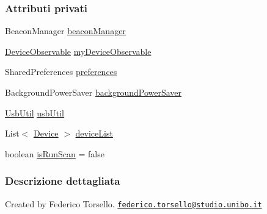 \subsubsection*{Attributi privati}
\begin{DoxyCompactItemize}
\item 
Beacon\+Manager \hyperlink{classit_1_1unibo_1_1torsello_1_1bluetoothpositioning_1_1activities_1_1ApplicationActivity_a973c37226a3dbba6016966c3555aff65_a973c37226a3dbba6016966c3555aff65}{beacon\+Manager}
\item 
\hyperlink{classit_1_1unibo_1_1torsello_1_1bluetoothpositioning_1_1observables_1_1DeviceObservable}{Device\+Observable} \hyperlink{classit_1_1unibo_1_1torsello_1_1bluetoothpositioning_1_1activities_1_1ApplicationActivity_aa6481e11e062d3539e6848f0790852b8_aa6481e11e062d3539e6848f0790852b8}{my\+Device\+Observable}
\item 
Shared\+Preferences \hyperlink{classit_1_1unibo_1_1torsello_1_1bluetoothpositioning_1_1activities_1_1ApplicationActivity_a3ee672ef79c268d0618ff3276c2e85f0_a3ee672ef79c268d0618ff3276c2e85f0}{preferences}
\item 
Background\+Power\+Saver \hyperlink{classit_1_1unibo_1_1torsello_1_1bluetoothpositioning_1_1activities_1_1ApplicationActivity_a85885639575161f4d73d4fc788f44ace_a85885639575161f4d73d4fc788f44ace}{background\+Power\+Saver}
\item 
\hyperlink{classit_1_1unibo_1_1torsello_1_1bluetoothpositioning_1_1util_1_1UsbUtil}{Usb\+Util} \hyperlink{classit_1_1unibo_1_1torsello_1_1bluetoothpositioning_1_1activities_1_1ApplicationActivity_abe62157d98c81406ae3d79dbc0fd9093_abe62157d98c81406ae3d79dbc0fd9093}{usb\+Util}
\item 
List$<$ \hyperlink{classit_1_1unibo_1_1torsello_1_1bluetoothpositioning_1_1model_1_1Device}{Device} $>$ \hyperlink{classit_1_1unibo_1_1torsello_1_1bluetoothpositioning_1_1activities_1_1ApplicationActivity_ad146f35cfee210f7191442658a235a2f_ad146f35cfee210f7191442658a235a2f}{device\+List}
\item 
boolean \hyperlink{classit_1_1unibo_1_1torsello_1_1bluetoothpositioning_1_1activities_1_1ApplicationActivity_a16080640c95a73d18c2b7ec21b785af1_a16080640c95a73d18c2b7ec21b785af1}{is\+Run\+Scan} = false
\end{DoxyCompactItemize}


\subsubsection{Descrizione dettagliata}
Created by Federico Torsello. \href{mailto:federico.torsello@studio.unibo.it}{\tt federico.\+torsello@studio.\+unibo.\+it} 

